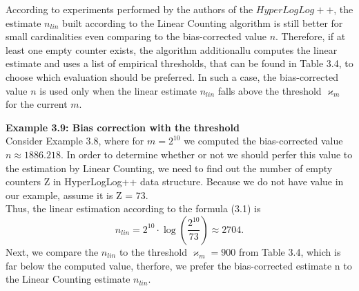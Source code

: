 \documentclass[a4paper,13pt]{article}
\theoremstyle{mytheor}
\begin{document}
\indent According to experiments performed by the authors of
the $HyperLogLog++$, the estimate $n_{lin}$ built according to the
Linear Counting algorithm is still better for small cardinalities even comparing
to the bias-corrected value $n$. Therefore, if at least one empty counter
exists, the algorithm additionallu computes the linear estimate and uses
a list of empirical thresholds, that can be found in Table 3.4, to choose
which evaluation should be preferred. In such a case, the bias-corrected
value $n$ is used only when the linear estimate $n_{lin}$ falls above
the threshold $\varkappa_m$ for the current $m$.
\begin{mdframed}
    \vspace{0.25cm}
    \textbf{Example 3.9: Bias correction with the threshold}\\
    Consider Example 3.8, where for $m = 2^{10}$ we computed the bias-corrected
    value $n \approx 1886.218$. In order to determine whether or not we should
    perfer this value to the estimation by Linear Counting, we need to find
    out the number of empty counters Z in HyperLogLog++ data structure.
    Because we do not have value in our example, assume it is Z = 73.\\
    Thus, the linear estimation according to the formula (3.1) is
    \[n_{lin} = 2^{10}\cdot\log\left(\frac{2^{10}}{73}\right) \approx 2704.\]
    Next, we compare the $n_{lin}$ to the threshold $\varkappa_m = 900$ from Table 3.4, which
    is far below the computed value, therfore, we prefer the bias-corrected
    estimate n to the Linear Counting estimate $n_{lin}$.
    
\end{mdframed}
    
\end{document}

